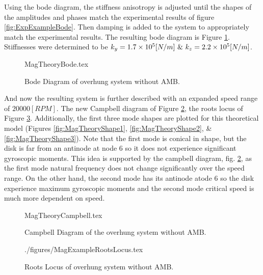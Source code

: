 Using the bode diagram, the stiffness anisotropy is adjusted until the shapes of the amplitudes and phases match the experimental results of figure \ref{fig:ExpExampleBode}. Then damping is added to the system to appropriately match the experimental results. The resulting bode diagram is Figure \ref{fig:MagTheoryBode}. Stiffnesses were determined to be $ k_y=1.7\e{5}[N/m]\ \&\ k_z=2.2\e{5}[N/m] $.
\begin{figure}[!htb]
	\def\width{.6\linewidth}
	\def\height{.4\linewidth}
	\def\sep{3em}
	\centering
	{MagTheoryBode.tex}
	\caption{Bode Diagram of overhung system without AMB.}
	\label{fig:MagTheoryBode}
\end{figure}
And now the resulting system is further described with an expanded speed range of $ 20000[RPM] $. The new Campbell diagram of Figure \ref{fig:MagTheoryCampbell}, the roots locus of Figure \ref{fig:MagTheoryRootLocus}. Additionally, the first three mode shapes are plotted for this theoretical model (Figures \ref{fig:MagTheoryShape1}, \ref{fig:MagTheoryShape2}, \& \ref{fig:MagTheoryShape3}). Note that the first mode is conical in shape, but the disk is far from an antinode at node 6 so it does not experience significant gyroscopic moments. This idea is supported by the campbell diagram, fig. \ref{fig:MagTheoryCampbell}, as the first mode natural frequency does not change significantly over the speed range. On the other hand, the second mode has its antinode atode 6 so the disk experience maximum gyroscopic moments and the second mode critical speed is much more dependent on speed.
\begin{figure}[!htb]
	\def\width{.6\linewidth}
	\def\height{.4\linewidth}
	\def\sep{3em}
	\centering
	{MagTheoryCampbell.tex}
	\caption{Campbell Diagram of the overhung system without AMB.}
	\label{fig:MagTheoryCampbell}
\end{figure}
\begin{figure}[!htb]
	\def\width{.6\linewidth}
	\def\height{.4\linewidth}
	\def\sep{3em}
	\centering
	{./figures/MagExampleRootsLocus.tex}
	\caption{Roots Locus of overhung system without AMB.}
	\label{fig:MagTheoryRootLocus}
\end{figure}
